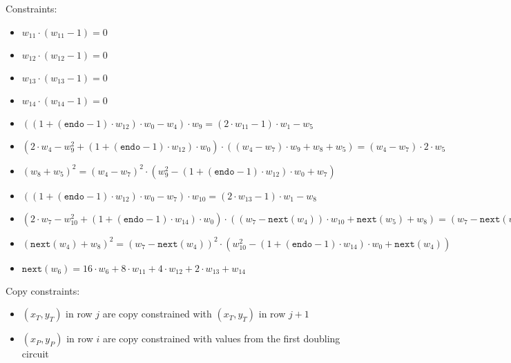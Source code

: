 Constraints:
\begin{itemize}
    \item $w_{11} \cdot (w_{11} - 1) = 0$
    \item $w_{12} \cdot (w_{12} - 1) = 0$
    \item $w_{13} \cdot (w_{13} - 1) = 0$
    \item $w_{14} \cdot (w_{14} - 1) = 0$
    \item $((1 + (\texttt{endo} - 1) \cdot w_{12}) \cdot w_{0} - w_{4}) \cdot w_{9} = (2 \cdot w_{11} - 1) \cdot w_{1} - w_{5}$
    \item $(2 \cdot w_{4} - w_{9}^2 + (1 + (\texttt{endo} - 1) \cdot w_{12}) \cdot w_{0}) \cdot ((w_{4} - w_{7}) \cdot w_{9} + w_{8} + w_{5}) = (w_{4} - w_{7}) \cdot 2 \cdot w_{5}$
    \item $(w_{8} + w_{5})^2 = (w_{4} - w_{7})^2 \cdot (w_{9}^2 - (1 + (\texttt{endo} - 1) \cdot w_{12}) \cdot w_{0} + w_{7})$
    \item $((1 + (\texttt{endo} - 1) \cdot w_{12}) \cdot w_{0} - w_{7}) \cdot w_{10} = (2 \cdot w_{13}-1) \cdot w_{1} - w_{8}$
    \item $(2 \cdot w_{7} - w_{10}^2 + (1 + (\texttt{endo} - 1) \cdot w_{14}) \cdot w_{0}) \cdot ((w_{7} - \texttt{next}(w_{4})) \cdot w_{10} + \texttt{next}(w_{5}) + w_{8}) = (w_{7} - \texttt{next}(w_{4})) \cdot 2 \cdot w_{8}$
    \item $(\texttt{next}(w_{4}) + w_{8})^2 = (w_{7} - \texttt{next}(w_{4}))^2 \cdot (w_{10}^2 - (1 + (\texttt{endo} - 1) \cdot w_{14}) \cdot w_{0} + \texttt{next}(w_{4}))$
    \item $\texttt{next}(w_{6}) = 16 \cdot w_{6} + 8 \cdot w_{11} + 4 \cdot w_{12} + 2 \cdot w_{13} + w_{14}$
\end{itemize}

    Copy constraints:
    \begin{itemize}
    \item $(x_T,y_T)$ in row $j$ are copy constrained with $(x_T,y_T)$ in row $j + 1$ 
    \item $(x_P,y_P)$ in row $i$ are copy constrained with values from the first doubling circuit
    \end{itemize}